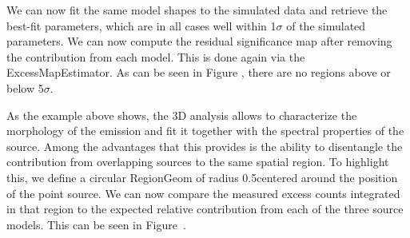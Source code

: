 We can now fit the same model shapes to the simulated data and retrieve the best-fit parameters, which are in all cases well within 1$\sigma$ of the simulated parameters. We can now compute the residual significance map after removing the contribution from each model. This is done again via the ExcessMapEstimator. As can be seen in Figure , there are no regions above or below 5$\sigma$.

As the example above shows, the 3D analysis allows to characterize the morphology of the emission and fit it together with the spectral properties of the source.  Among the advantages that this provides is the ability to disentangle the contribution from overlapping sources to the same spatial region. To highlight this, we define a circular RegionGeom of radius 0.5\textdegree centered around the position of the point source. We can now compare the measured excess counts integrated in that region to the expected relative contribution from each of the three source models. This can be seen in Figure~.


%
